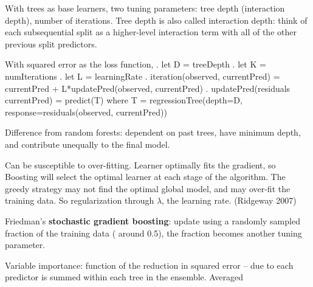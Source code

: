 \documentclass[]{article}
\begin{document}
With trees as base learners, two tuning parameters: tree depth
(interaction depth), number of iterations. Tree depth is also called
interaction depth: think of each subsequential split as a higher-level
interaction term with all of the other previous split predictors.

With squared error as the loss function, . let D = treeDepth . let K =
numIterations . let L = learningRate . iteration(observed, currentPred)
= currentPred + L*updatePred(observed, currentPred) .
updatePred(residuals currentPred) = predict(T) where T =
regressionTree(depth=D, response=residuals(observed, currentPred))

Difference from random forests: dependent on past trees, have minimum
depth, and contribute unequally to the final model.

Can be susceptible to over-fitting. Learner optimally fits the gradient,
so Boosting will select the optimal learner at each stage of the
algorithm. The greedy strategy may not find the optimal global model,
and may over-fit the training data. So regularization through
\(\lambda\), the learning rate. (Ridgeway 2007)

Friedman's \textbf{stochastic gradient boosting}: update using a
randomly sampled fraction of the training data ( around 0.5), the
fraction becomes another tuning parameter.

Variable importance: function of the reduction in squared error -- due
to each predictor is summed within each tree in the ensemble. Averaged
\end{document}

